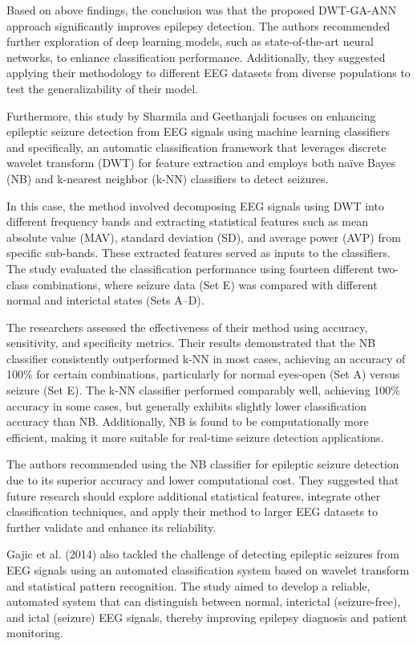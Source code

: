\documentclass{article}
\begin{document}
Based on above findings, the conclusion was that the proposed DWT-GA-ANN approach significantly improves epilepsy detection. The authors recommended further exploration of deep learning models, such as state-of-the-art neural networks, to enhance classification performance. Additionally, they suggested applying their methodology to different EEG datasets from diverse populations to test the generalizability of their model.

Furthermore, this \cite{sharmila2016} study by Sharmila and Geethanjali focuses on enhancing epileptic seizure detection from EEG signals using machine learning classifiers and specifically, an automatic classification framework that leverages discrete wavelet transform (DWT) for feature extraction and employs both naïve Bayes (NB) and k-nearest neighbor (k-NN) classifiers to detect seizures.

In this case, the method involved decomposing EEG signals using DWT into different frequency bands and extracting statistical features such as mean absolute value (MAV), standard deviation (SD), and average power (AVP) from specific sub-bands. These extracted features served as inputs to the classifiers. The study evaluated the classification performance using fourteen different two-class combinations, where seizure data (Set E) was compared with different normal and interictal states (Sets A–D).

The researchers assessed the effectiveness of their method using accuracy, sensitivity, and specificity metrics. Their results demonstrated that the NB classifier consistently outperformed k-NN in most cases, achieving an accuracy of 100\% for certain combinations, particularly for normal eyes-open (Set A) versus seizure (Set E). The k-NN classifier performed comparably well, achieving 100\% accuracy in some cases, but generally exhibits slightly lower classification accuracy than NB. Additionally, NB is found to be computationally more efficient, making it more suitable for real-time seizure detection applications.

The authors recommended using the NB classifier for epileptic seizure detection due to its superior accuracy and lower computational cost. They suggested that future research should explore additional statistical features, integrate other classification techniques, and apply their method to larger EEG datasets to further validate and enhance its reliability.

Gajic et al. (2014) \cite{gajic2014} also tackled the challenge of detecting epileptic seizures from EEG signals using an automated classification system based on wavelet transform and statistical pattern recognition. The study aimed to develop a reliable, automated system that can distinguish between normal, interictal (seizure-free), and ictal (seizure) EEG signals, thereby improving epilepsy diagnosis and patient monitoring.
\end{document}

